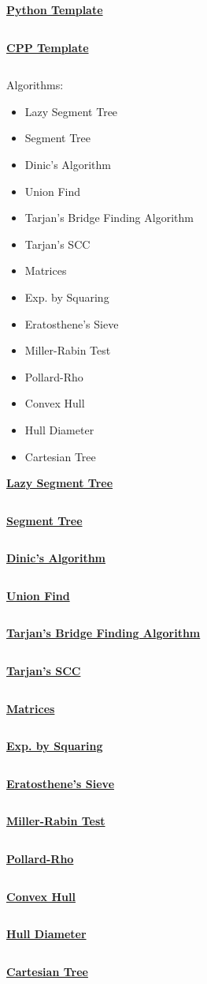 \documentclass{article}
\newcommand{\algo}[1]{\underline{\Large{\textbf{#1}}}}
\begin{document}
\begin{multicols*}{2}
	
	\algo{Python Template}
	\inputminted[breaklines=true]{python}{other/template.py}
	
	\algo{CPP Template}
	\inputminted[breaklines=true]{cpp}{other/template.cpp}
	
	Algorithms:
	\begin{itemize}
		\item Lazy Segment Tree
		\item Segment Tree
		\item Dinic's Algorithm
		\item Union Find
		\item Tarjan's Bridge Finding Algorithm
		\item Tarjan's SCC
		\item Matrices
		\item Exp. by Squaring
		\item Eratosthene's Sieve
		\item Miller-Rabin Test
		\item Pollard-Rho
		\item Convex Hull
		\item Hull Diameter
		\item Cartesian Tree
	\end{itemize}

	\algo{Lazy Segment Tree}
	\inputminted[breaklines=true]{python}{algorithms/lazysegmenttree.py}

	\algo{Segment Tree}
	\inputminted[breaklines=true]{python}{algorithms/segmenttree.py}

	\algo{Dinic's Algorithm}
	\inputminted[breaklines=true]{python}{algorithms/dinics.py}

	\algo{Union Find}
	\inputminted[breaklines=true]{python}{algorithms/unionfind.py}
	
	\algo{Tarjan's Bridge Finding Algorithm}
	\inputminted[breaklines=true]{python}{algorithms/bridgefinding.py}
	
	\algo{Tarjan's SCC}
	\inputminted[breaklines=true]{python}{algorithms/tarjans.py}

	\algo{Matrices}
	\inputminted[breaklines=true]{python}{algorithms/matrix.py}

	\algo{Exp. by Squaring}
	\inputminted[breaklines=true]{python}{algorithms/exp.py}

	\algo{Eratosthene's Sieve}
	\inputminted[breaklines=true]{python}{algorithms/sieve.py}

	\algo{Miller-Rabin Test}
	\inputminted[breaklines=true]{python}{algorithms/millerrabin.py}

	\algo{Pollard-Rho}
	\inputminted[breaklines=true]{python}{algorithms/pollardrho.py}

	\algo{Convex Hull}
	\inputminted[breaklines=true]{python}{algorithms/convexhull.py}
	
	\algo{Hull Diameter}
	\inputminted[breaklines=true]{python}{algorithms/hulldiameter.py}
	
	\algo{Cartesian Tree}
	\inputminted[breaklines=true]{python}{algorithms/cartesiantree.py}

\end{multicols*}
\end{document}
